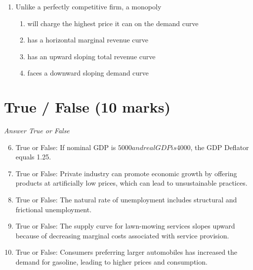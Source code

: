 \documentclass[12pt]{article}
\begin{document}
\begin{enumerate}[label=\arabic*.]
\begin{enumerate}[label=(\alph*)]
    \item The wage that is paid to the assistant manager
    \item The cost of purchasing canned goods from a wholesale food distributor
    \item The value placed on the owner's skills in an alternative career
    \item The cost of cooling the refrigerated meat display
\end{enumerate}
\item Unlike a perfectly competitive firm, a monopoly
\begin{enumerate}[label=(\alph*)]
    \item will charge the highest price it can on the demand curve
    \item has a horizontal marginal revenue curve
    \item has an upward sloping total revenue curve
    \item faces a downward sloping demand curve
\end{enumerate}
\end{enumerate}

\section*{True / False (10 marks)}
\textit{Answer True or False}
\begin{enumerate}[label=\arabic*.]
\setcounter{enumi}{5}
\item True or False: If nominal GDP is $5000 and real GDP is $4000, the GDP Deflator equals 1.25.
\item True or False: Private industry can promote economic growth by offering products at artificially low prices, which can lead to unsustainable practices.
\item True or False: The natural rate of unemployment includes structural and frictional unemployment.
\item True or False: The supply curve for lawn-mowing services slopes upward because of decreasing marginal costs associated with service provision.
\item True or False: Consumers preferring larger automobiles has increased the demand for gasoline, leading to higher prices and consumption.
\end{enumerate}
\end{document}
